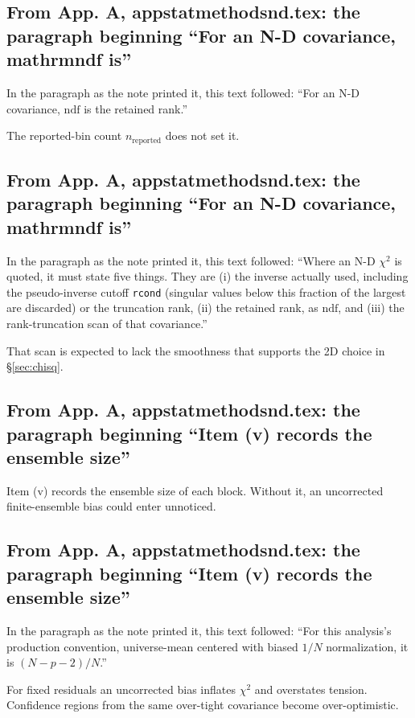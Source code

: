 \subsection{From App. A, appstatmethodsnd.tex: the paragraph beginning ``For an N-D covariance, mathrmndf is''}
In the paragraph as the note printed it, this text followed: ``For an N-D covariance, $\mathrm{ndf}$ is the retained rank.''\par
The reported-bin count $n_{\text{reported}}$ does not set it.

\subsection{From App. A, appstatmethodsnd.tex: the paragraph beginning ``For an N-D covariance, mathrmndf is''}
In the paragraph as the note printed it, this text followed: ``Where an N-D $\chi^{2}$ is quoted, it must state five things. They are (i) the inverse actually used, including the pseudo-inverse cutoff \texttt{rcond} (singular values below this fraction of the largest are discarded) or the truncation rank, (ii) the retained rank, as $\mathrm{ndf}$, and (iii) the rank-truncation scan of that covariance.''\par
That scan is expected to lack the smoothness that supports the 2D choice in \S\ref{sec:chisq}.

\subsection{From App. A, appstatmethodsnd.tex: the paragraph beginning ``Item (v) records the ensemble size''}
Item (v) records the ensemble size of each block. Without it, an uncorrected finite-ensemble bias could enter unnoticed.

\subsection{From App. A, appstatmethodsnd.tex: the paragraph beginning ``Item (v) records the ensemble size''}
In the paragraph as the note printed it, this text followed: ``For this analysis's production convention, universe-mean centered with biased $1/N$ normalization, it is $(N-p-2)/N$.''\par
For fixed residuals an uncorrected bias inflates $\chi^{2}$ and overstates tension. Confidence regions from the same over-tight covariance become over-optimistic.

